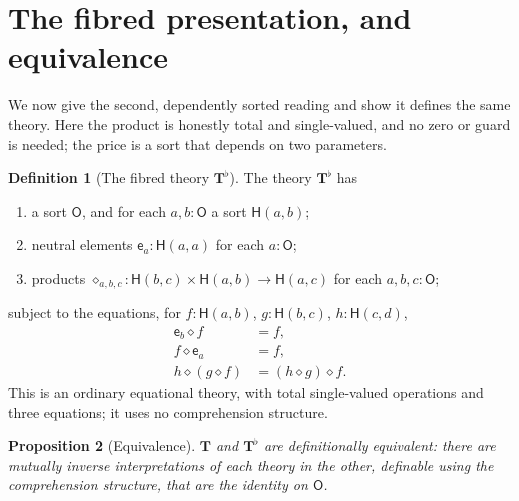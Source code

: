 \documentclass[11pt]{article}
\theoremstyle{definition}
\newtheorem{definition}{Definition}[section]
\theoremstyle{plain}
\newtheorem{proposition}[definition]{Proposition}
\newcommand{\Ob}{\mathsf{O}}            %
\newcommand{\Hom}{\mathsf{H}}           %
\newcommand{\co}{\mathbin{\diamond}}    %
\newcommand{\unitf}{\mathsf{e}}         %
\begin{document}
\section{The fibred presentation, and equivalence}\label{sec:equiv}

We now give the second, dependently sorted reading and show it defines the same
theory. Here the product is honestly total and single-valued, and no zero or
guard is needed; the price is a sort that depends on two parameters.

\begin{definition}[The fibred theory $\mathbf{T}^{\flat}$]\label{def:flat}
The theory $\mathbf{T}^{\flat}$ has
\begin{enumerate}[label=(\roman*)]
  \item a sort $\Ob$, and for each $a,b\colon\Ob$ a sort $\Hom(a,b)$;
  \item neutral elements $\unitf_a\colon\Hom(a,a)$ for each $a\colon\Ob$;
  \item products
        $\co_{a,b,c}\colon\Hom(b,c)\times\Hom(a,b)\to\Hom(a,c)$
        for each $a,b,c\colon\Ob$;
\end{enumerate}
subject to the equations, for $f\colon\Hom(a,b)$, $g\colon\Hom(b,c)$,
$h\colon\Hom(c,d)$,
\begin{align}
  \unitf_b \co f &= f, \tag{F1}\\
  f \co \unitf_a &= f, \tag{F2}\\
  h \co (g\co f) &= (h\co g)\co f. \tag{F3}
\end{align}
This is an ordinary equational theory, with total single-valued operations and
three equations; it uses no comprehension structure.
\end{definition}

\begin{proposition}[Equivalence]\label{prop:equiv}
$\mathbf{T}$ and $\mathbf{T}^{\flat}$ are definitionally equivalent: there are
mutually inverse interpretations of each theory in the other, definable using
the comprehension structure, that are the identity on $\Ob$.
\end{proposition}
\end{document}
